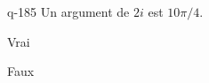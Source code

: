 \begin{truefalse}{q-185}
Un argument de $2i$ est $10\pi/4$.
\item* Vrai
\item Faux
\end{truefalse}

